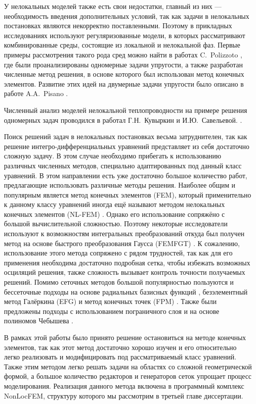 У нелокальных моделей также есть свои недостатки, главный из них --- необходимость введения дополнительных условий, так как задачи в нелокальных постановках являются некорректно поставленными. Поэтому в прикладных исследованиях используют регуляризованные модели, в которых рассматривают комбинированные среды, состоящие из локальной и нелокальной фаз. Первые примеры рассмотрения такого рода сред можно найти в работах C.~Polizzoto \cite{Polizzotto1, Polizzotto2}, где были проанализированы одномерные задачи упругости, а также разработан численные метод решения, в основе которого был использован метод конечных элементов. Развитие этих идей на двумерные задачи упругости было описано в работе A.A.~Pisano \cite{Pisano1}.

Численный анализ моделей нелокальной теплопроводности на примере решения одномерных задач проводился в работал Г.Н.~Кувыркин и И.Ю.~Савельевой.
\cite{NonlocalSaintVenant}.

Поиск решений задач в нелокальных постановках весьма затруднителен, так как решение интегро-дифференциальных уравнений представляет из себя достаточно сложную задачу. В этом случае необходимо прибегать к использованию различных численных методов, специально адаптированных под данный класс уравнений. В этом направлении есть уже достаточно большое количество работ, предлагающие использовать различные методы решения. Наиболее общим и популярным является метод конечных элементов (FEM), который применительно к данному классу уравнений иногда ещё называют методом нелокальных конечных элементов (NL-FEM) \cite{Polizzotto2, Pisano1}. Однако его использование сопряжёно с большой вычислительной сложностью. Поэтому некоторые исследователи используют к возможностям интегральных преобразований откуда был получен метод на основе быстрого преобразования Гаусса (FEMFGT) \cite{FastGaussTransform}. К сожалению, использование этого метода сопряжено с рядом трудностей, так как для его применения необходима достаточно подробная сетка, чтобы избежать возможных осциляций решения, также сложность вызывает контроль точности получаемых решений. Помимо сеточных методов большой популярностью пользуются и бессеточные подходы на основе радиальных базисных функций \cite{RadialBasis}, безэлементный метод Галёркина (EFG) и метод конечных точек (FPM) \cite{MeshFree}. Также были предложены подходы с использованием пограничного слоя \cite{BondaryLayer} и на основе полиномов Чебышева \cite{ChebPolynom}.

В рамках этой работы было принято решение остановиться на методе конечных элементов, так как этот метод достаточно хорошо изучен и его относительно легко реализовать и модифицировать под рассматриваемый класс уравнений. Также этим методом легко решать задачи на областях со сложной геометрической формой, а большое количество редакторов и генераторов сеток упрощает процесс моделирования. Реализация данного метода включена в программный комплекс NonLocFEM, структуру которого мы рассмотрим в третьей главе диссертации.

